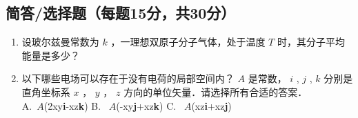 
\subsection{简答/选择题（每题15分，共30分）}
\begin{enumerate}
\item 设玻尔兹曼常数为 $k$ ，一理想双原子分子气体，处于温度 $T$ 时，其分子平均能量是多少？
\item 以下哪些电场可以存在于没有电荷的局部空间内？ $A$ 是常数， $i$ , $j$ , $k$ 分别是直角坐标系 $x$ ， $y$ ， $z$ 方向的单位矢量．请选择所有合适的答案．\\
A.\ $A$(2xy\textbf{i}-xz\textbf{k}) \qquad B. \ $A$(-xy\textbf{j}+xz\textbf{k}) \qquad C. \ $A$(xz\textbf{i}+xz\textbf{j})
\end{enumerate}